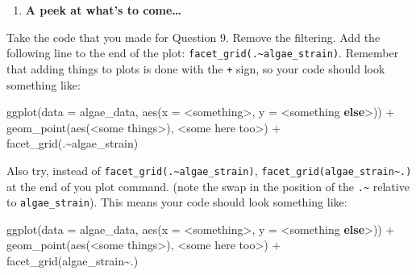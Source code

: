 \documentclass[
]{krantz}
\newenvironment{Shaded}{\begin{snugshade}}{\end{snugshade}}
\newcommand{\AttributeTok}[1]{\textcolor[rgb]{0.77,0.63,0.00}{#1}}
\newcommand{\ControlFlowTok}[1]{\textcolor[rgb]{0.13,0.29,0.53}{\textbf{#1}}}
\newcommand{\FunctionTok}[1]{\textcolor[rgb]{0.00,0.00,0.00}{#1}}
\newcommand{\NormalTok}[1]{#1}
\newcommand{\SpecialCharTok}[1]{\textcolor[rgb]{0.00,0.00,0.00}{#1}}
\providecommand{\tightlist}{%
  \setlength{\itemsep}{0pt}\setlength{\parskip}{0pt}}
\begin{document}
\begin{enumerate}
\def\labelenumi{\arabic{enumi}.}
\setcounter{enumi}{8}
\tightlist
\item
  \textbf{A peek at what's to come\ldots{}}
\end{enumerate}

Take the code that you made for Question 9. Remove the filtering. Add the following line to the end of the plot: \texttt{facet\_grid(.\textasciitilde{}algae\_strain)}. Remember that adding things to plots is done with the \texttt{+} sign, so your code should look something like:

\begin{Shaded}
\begin{Highlighting}[]
\FunctionTok{ggplot}\NormalTok{(}\AttributeTok{data =}\NormalTok{ algae\_data, }\FunctionTok{aes}\NormalTok{(}\AttributeTok{x =} \SpecialCharTok{\textless{}}\NormalTok{something}\SpecialCharTok{\textgreater{}}\NormalTok{, }\AttributeTok{y =} \SpecialCharTok{\textless{}}\NormalTok{something }\ControlFlowTok{else}\SpecialCharTok{\textgreater{}}\NormalTok{)) }\SpecialCharTok{+}
  \FunctionTok{geom\_point}\NormalTok{(}\FunctionTok{aes}\NormalTok{(}\SpecialCharTok{\textless{}}\NormalTok{some things}\SpecialCharTok{\textgreater{}}\NormalTok{), }\SpecialCharTok{\textless{}}\NormalTok{some here too}\SpecialCharTok{\textgreater{}}\NormalTok{) }\SpecialCharTok{+}
  \FunctionTok{facet\_grid}\NormalTok{(.}\SpecialCharTok{\textasciitilde{}}\NormalTok{algae\_strain)}
\end{Highlighting}
\end{Shaded}

Also try, instead of \texttt{facet\_grid(.\textasciitilde{}algae\_strain)}, \texttt{facet\_grid(algae\_strain\textasciitilde{}.)} at the end of you plot command. (note the swap in the position of the \texttt{.\textasciitilde{}} relative to \texttt{algae\_strain}). This means your code should look something like:

\begin{Shaded}
\begin{Highlighting}[]
\FunctionTok{ggplot}\NormalTok{(}\AttributeTok{data =}\NormalTok{ algae\_data, }\FunctionTok{aes}\NormalTok{(}\AttributeTok{x =} \SpecialCharTok{\textless{}}\NormalTok{something}\SpecialCharTok{\textgreater{}}\NormalTok{, }\AttributeTok{y =} \SpecialCharTok{\textless{}}\NormalTok{something }\ControlFlowTok{else}\SpecialCharTok{\textgreater{}}\NormalTok{)) }\SpecialCharTok{+}
  \FunctionTok{geom\_point}\NormalTok{(}\FunctionTok{aes}\NormalTok{(}\SpecialCharTok{\textless{}}\NormalTok{some things}\SpecialCharTok{\textgreater{}}\NormalTok{), }\SpecialCharTok{\textless{}}\NormalTok{some here too}\SpecialCharTok{\textgreater{}}\NormalTok{) }\SpecialCharTok{+}
  \FunctionTok{facet\_grid}\NormalTok{(algae\_strain}\SpecialCharTok{\textasciitilde{}}\NormalTok{.)}
\end{Highlighting}
\end{Shaded}
\end{document}
